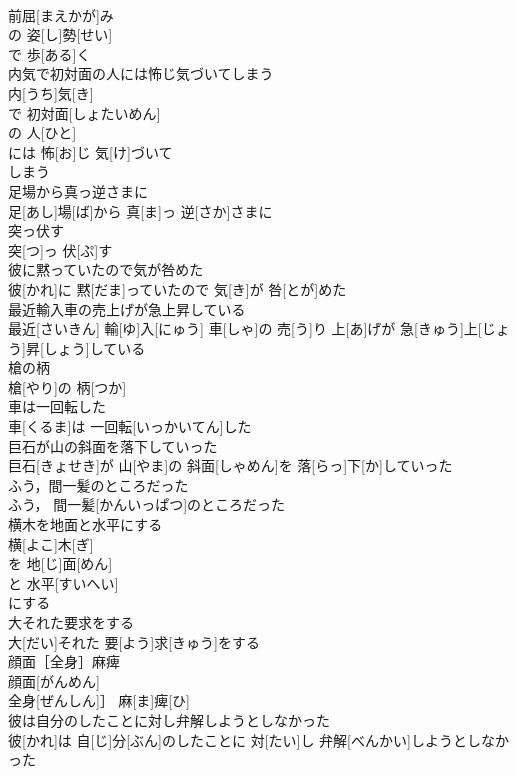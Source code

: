 \documentclass[8pt]{extreport}
\begin{document}
\begin{CJK}{UTF8}{min}
\\	前屈[まえかが]み 
\\	の 姿[し]勢[せい]
\\	で 歩[ある]く 
\\	内気で初対面の人には怖じ気づいてしまう	
\\	内[うち]気[き]
\\	で 初対面[しょたいめん]
\\	の 人[ひと]
\\	には 怖[お]じ 気[け]づいて 
\\	しまう 
\\	足場から真っ逆さまに	
\\	足[あし]場[ば]から 真[ま]っ 逆[さか]さまに
\\	突っ伏す	
\\	突[つ]っ 伏[ぷ]す
\\	彼に黙っていたので気が咎めた	
\\	彼[かれ]に 黙[だま]っていたので 気[き]が 咎[とが]めた
\\	最近輸入車の売上げが急上昇している	
\\	最近[さいきん] 輸[ゆ]入[にゅう] 車[しゃ]の 売[う]り 上[あ]げが 急[きゅう]上[じょう]昇[しょう]している
\\	槍の柄	
\\	槍[やり]の 柄[つか]
\\	車は一回転した	
\\	車[くるま]は 一回転[いっかいてん]した
\\	巨石が山の斜面を落下していった	
\\	巨石[きょせき]が 山[やま]の 斜面[しゃめん]を 落[らっ]下[か]していった
\\	ふう，間一髪のところだった	
\\	ふう， 間一髪[かんいっぱつ]のところだった
\\	横木を地面と水平にする	
\\	横[よこ]木[ぎ]
\\	を 地[じ]面[めん]
\\	と 水平[すいへい]
\\	にする 
\\	大それた要求をする	
\\	大[だい]それた 要[よう]求[きゅう]をする
\\	顔面［全身］麻痺	
\\	顔面[がんめん]
\\	全身[ぜんしん]］ 麻[ま]痺[ひ]
\\	彼は自分のしたことに対し弁解しようとしなかった	
\\	彼[かれ]は 自[じ]分[ぶん]のしたことに 対[たい]し 弁解[べんかい]しようとしなかった

\end{CJK}
\end{document}
